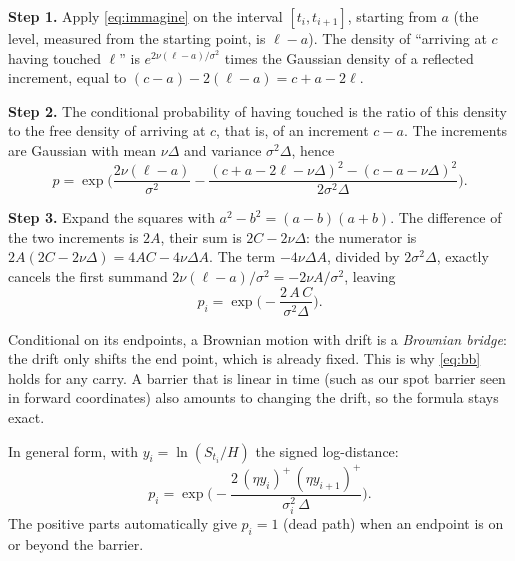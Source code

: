 \noindent\textbf{Step 1.} Apply \eqref{eq:immagine} on the interval $[t_i,t_{i+1}]$, starting from $a$ (the level,
measured from the starting point, is $\ell-a$). The density of ``arriving at $c$ having touched $\ell$'' is
$e^{2\nu(\ell-a)/\sigma^2}$ times the Gaussian density of a reflected increment, equal to $(c-a)-2(\ell-a)=c+a-2\ell$.

\noindent\textbf{Step 2.} The conditional probability of having touched is the ratio of this density to the free
density of arriving at $c$, that is, of an increment $c-a$. The increments are Gaussian with mean $\nu\Delta$ and
variance $\sigma^2\Delta$, hence
\[
p=\exp\!\Big(\frac{2\nu(\ell-a)}{\sigma^2}-\frac{(c+a-2\ell-\nu\Delta)^2-(c-a-\nu\Delta)^2}{2\sigma^2\Delta}\Big).
\]

\noindent\textbf{Step 3.} Expand the squares with $a^2-b^2=(a-b)(a+b)$. The difference of the two increments is $2A$,
their sum is $2C-2\nu\Delta$: the numerator is $2A(2C-2\nu\Delta)=4AC-4\nu\Delta A$. The term $-4\nu\Delta A$,
divided by $2\sigma^2\Delta$, exactly cancels the first summand $2\nu(\ell-a)/\sigma^2=-2\nu A/\sigma^2$, leaving
\begin{equation}\label{eq:bb}
p_i=\exp\!\Big(-\frac{2\,A\,C}{\sigma^2\Delta}\Big).
\end{equation}
\begin{perche}[title={Why the drift disappears}]
Conditional on its endpoints, a Brownian motion with drift is a \emph{Brownian bridge}: the drift only shifts the end
point, which is already fixed. This is why \eqref{eq:bb} holds for any carry. A barrier that is linear in time (such
as our spot barrier seen in forward coordinates) also amounts to changing the drift, so the formula stays exact.
\end{perche}
In general form, with $y_i=\ln(S_{t_i}/H)$ the signed log-distance:
\[
p_i=\exp\!\Big(-\frac{2\,(\eta y_i)^+\,(\eta y_{i+1})^+}{\sigma_i^2\,\Delta}\Big).
\]
The positive parts automatically give $p_i=1$ (dead path) when an endpoint is on or beyond the barrier.

